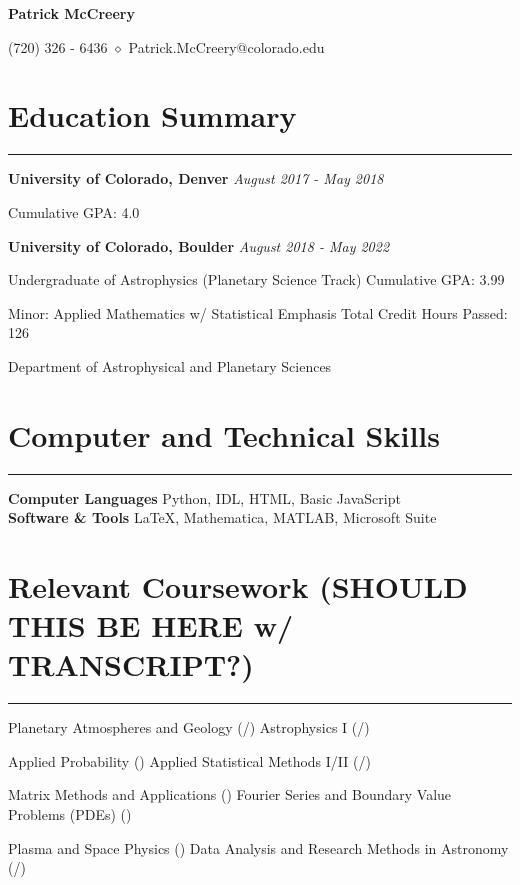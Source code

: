 \documentclass{article}
\newcommand{\divider}{\vskip-2pt\hrule\vskip4pt}
\begin{document}
\begin{center}
	\huge\textbf{Patrick McCreery}
\end{center}

\begin{center}
	(720) 326 - 6436 $\diamond$ Patrick.McCreery@colorado.edu
\end{center}


\section{Education Summary}
\divider
{\bf University of Colorado, Denver} \hfill {\em August 2017 - May 2018}

\quad \quad \hfill Cumulative GPA: 4.0

{\bf University of Colorado, Boulder} \hfill {\em August 2018 - May 2022}

\quad \quad Undergraduate of Astrophysics (Planetary Science Track) \hfill Cumulative GPA: 3.99

\quad \quad \quad Minor: Applied Mathematics w/ Statistical Emphasis \hfill Total Credit Hours Passed: 126

\quad \quad Department of Astrophysical and Planetary Sciences\\
\section{Computer and Technical Skills}
\divider

{\bf Computer Languages} \hspace{10pt} { Python, IDL, HTML, Basic JavaScript}\\
{\bf Software \& Tools} \hspace{30pt} { \LaTeX, Mathematica, MATLAB, Microsoft Suite}\\

\section{Relevant Coursework (SHOULD THIS BE HERE w/ TRANSCRIPT?)}

\divider


Planetary Atmospheres and Geology (/) \hfill Astrophysics I (/)

Applied Probability () \hfill Applied Statistical Methods I/II (/)

Matrix Methods and Applications () \hfill Fourier Series and Boundary Value Problems (PDEs) ()

Plasma and Space Physics () \hfill Data Analysis and Research Methods in Astronomy (/)
\end{document}
